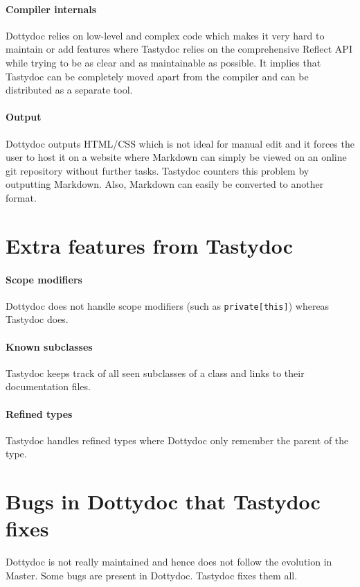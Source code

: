 \documentclass{report}
\begin{document}
\paragraph{Compiler internals}
Dottydoc relies on low-level and complex code which makes it very hard to maintain or add features where Tastydoc relies on the comprehensive Reflect API while trying to be as clear and as maintainable as possible. It implies that Tastydoc can be completely moved apart from the compiler and can be distributed as a separate tool.

\paragraph{Output}
Dottydoc outputs HTML/CSS which is not ideal for manual edit and it forces the user to host it on a website where Markdown can simply be viewed on an online git repository without further tasks. Tastydoc counters this problem by outputting Markdown. Also, Markdown can easily be converted to another format.

\section{Extra features from Tastydoc}
\label{sec:extra}
\paragraph{Scope modifiers}
Dottydoc does not handle scope modifiers (such as \texttt{private[this]}) whereas Tastydoc does.

\paragraph{Known subclasses}
Tastydoc keeps track of all seen subclasses of a class and links to their documentation files.

\paragraph{Refined types}
Tastydoc handles refined types where Dottydoc only remember the parent of the type.

\section{Bugs in Dottydoc that Tastydoc fixes}
Dottydoc is not really maintained and hence does not follow the evolution in Master. Some bugs are present in Dottydoc. Tastydoc fixes them all.
\end{document}
